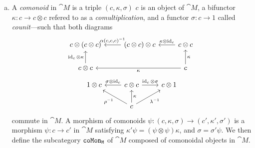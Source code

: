 \documentclass[../../deep-dive]{subfiles}
\begin{document}
\begin{definition}
\begin{enumerate}[(a)]
        \item A \emph{comonoid} in \(\cat M\) is a triple \((c, \kappa, \sigma)\)
              \(c\) is an object of \(\cat M\), a bifunctor \(\kappa: c \to c \otimes c\)
              refered to as a \emph{comultiplication}, and a functor \(\sigma: c \to 1\)
              called \emph{counit}---such that both diagrams
              \[
                  \begin{tikzcd}
                      c \otimes (c \otimes c)
                      &(c \otimes c) \otimes c
                      \ar[l, "{\alpha(c, c, c)^{-1}}"']
                      &c \otimes c
                      \ar[l, "\kappa \otimes \Id_c"']
                      \\
                      c \otimes c
                      \ar[u, "\Id_c \otimes \kappa"]
                      &&c \ar[ll, "\kappa"] \ar[u, "\kappa"']
                  \end{tikzcd}
              \]
              \[
                  \begin{tikzcd}
                      1 \otimes c
                      & c \otimes c
                      \ar[l, "\sigma \otimes \Id_c"']
                      \ar[r, "\Id_c \otimes \sigma"]
                      &c \otimes 1
                      \\
                      &c \ar[u, "\kappa"'] \ar[lu, "\rho^{-1}"] \ar[ru, "\lambda^{-1}"'] &
                  \end{tikzcd}
              \]
              commute in \(\cat M\). A morphism of comonoids
              \(\psi: (c, \kappa, \sigma) \to (c', \kappa', \sigma')\) is a morphism
              \(\psi: c \to c'\) in \(\cat M\) satisfying
              \(\kappa' \psi = (\psi \otimes \psi) \kappa\), and \(\sigma = \sigma'
              \psi\). We then define the subcategory \({\texttt{coMon}}_{\texttt M}\) of \(\cat M\)
              composed of comonoidal objects in \(\cat M\).
    \end{enumerate}
\end{definition}
\end{document}
